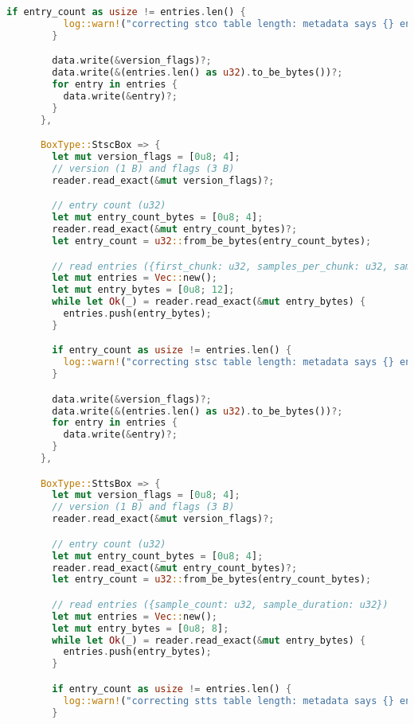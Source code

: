 \begin{lstlisting}[language=Rust]
        if entry_count as usize != entries.len() {
          log::warn!("correcting stco table length: metadata says {} entries, but should actually be {} entries", entry_count, entries.len());
        }

        data.write(&version_flags)?;
        data.write(&(entries.len() as u32).to_be_bytes())?;
        for entry in entries {
          data.write(&entry)?;
        }
      },

      BoxType::StscBox => {
        let mut version_flags = [0u8; 4];
        // version (1 B) and flags (3 B)
        reader.read_exact(&mut version_flags)?;

        // entry count (u32)
        let mut entry_count_bytes = [0u8; 4];
        reader.read_exact(&mut entry_count_bytes)?;
        let entry_count = u32::from_be_bytes(entry_count_bytes);

        // read entries ({first_chunk: u32, samples_per_chunk: u32, sample_description_id: u32})
        let mut entries = Vec::new();
        let mut entry_bytes = [0u8; 12];
        while let Ok(_) = reader.read_exact(&mut entry_bytes) {
          entries.push(entry_bytes);
        }

        if entry_count as usize != entries.len() {
          log::warn!("correcting stsc table length: metadata says {} entries, but should actually be {} entries", entry_count, entries.len());
        }

        data.write(&version_flags)?;
        data.write(&(entries.len() as u32).to_be_bytes())?;
        for entry in entries {
          data.write(&entry)?;
        }
      },

      BoxType::SttsBox => {
        let mut version_flags = [0u8; 4];
        // version (1 B) and flags (3 B)
        reader.read_exact(&mut version_flags)?;

        // entry count (u32)
        let mut entry_count_bytes = [0u8; 4];
        reader.read_exact(&mut entry_count_bytes)?;
        let entry_count = u32::from_be_bytes(entry_count_bytes);

        // read entries ({sample_count: u32, sample_duration: u32})
        let mut entries = Vec::new();
        let mut entry_bytes = [0u8; 8];
        while let Ok(_) = reader.read_exact(&mut entry_bytes) {
          entries.push(entry_bytes);
        }

        if entry_count as usize != entries.len() {
          log::warn!("correcting stts table length: metadata says {} entries, but should actually be {} entries", entry_count, entries.len());
        }


\end{lstlisting}
